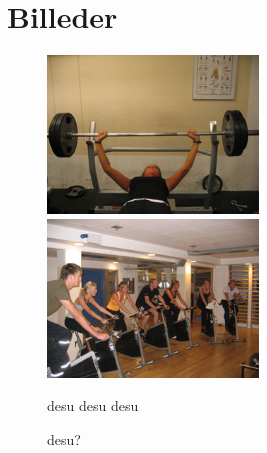 \chapter{Billeder}
\begin{figure}[htbp]
	\centering
	\begin{minipage}[b]{0.48\textwidth}\centering
	\includegraphics[width=0.50\textwidth]{billeder/billede1.jpg}
	\end{minipage}
	\begin{minipage}[b]{0.48\textwidth}\centering
	\includegraphics[width=0.50\textwidth]{billeder/billede2.jpg}
	\end{minipage}
	\begin{minipage}[t]{0.48\textwidth}
	\caption{desu desu desu}
	\label{fig:desu}
	\end{minipage} \hfill
	\begin{minipage}[t]{0.48\textwidth}
	\caption{desu?}
	\label{fig:henning}
	\end{minipage}
\end{figure}
